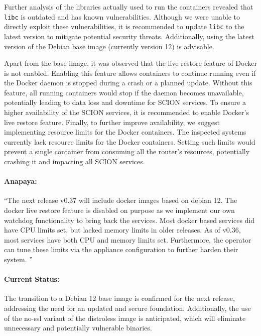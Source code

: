 Further analysis of the libraries actually used to run the containers revealed that \texttt{libc} is outdated and has known vulnerabilities.
Although we were unable to directly exploit these vulnerabilities, it is recommended to update \texttt{libc} to the latest version to mitigate potential security threats.
Additionally, using the latest version of the Debian base image (currently version 12) is advisable.

Apart from the base image, it was observed that the live restore feature of Docker is not enabled.
Enabling this feature allows containers to continue running even if the Docker daemon is stopped during a crash or a planned update.
Without this feature, all running containers would stop if the daemon becomes unavailable, potentially leading to data loss and downtime for SCION services.
To ensure a higher availability of the SCION services, it is recommended to enable Docker's live restore feature.
\newpage
Finally, to further improve availability, we suggest implementing resource limits for the Docker containers.
The inspected systems currently lack resource limits for the Docker containers.
Setting such limits would prevent a single container from consuming all the router's resources, potentially crashing it and impacting all SCION services.

\begin{boxH}
\paragraph{Anapaya:}
``The next release v0.37 will include docker images based on debian 12. The docker live restore feature is disabled on purpose as we implement our own watchdog functionality to bring back the services. Most docker based services did have CPU limits set, but lacked memory limits in older releases. As of v0.36, most services have both CPU and memory limits set. Furthermore, the operator can tune these limits via the appliance configuration to further harden their system.
''
\end{boxH}

\paragraph{Current Status:}
The transition to a Debian 12 base image is confirmed for the next release, addressing the need for an updated and secure foundation.
Additionally, the use of the no-ssl variant of the distroless image is anticipated, which will eliminate unnecessary and potentially vulnerable binaries.

